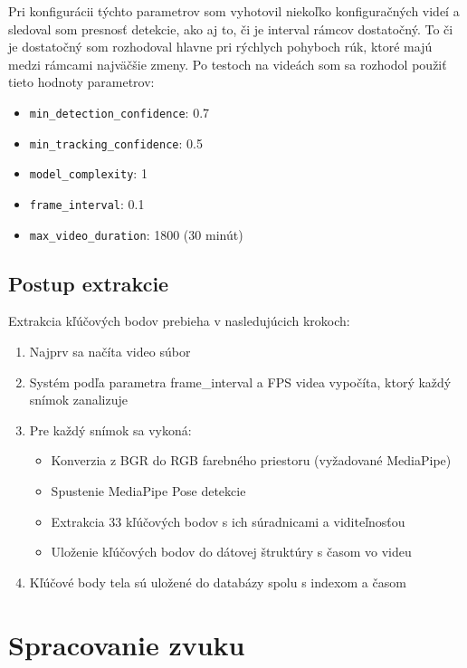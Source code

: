 Pri konfigurácii týchto parametrov som vyhotovil niekoľko konfiguračných videí a sledoval som presnosť detekcie, ako aj to, či je interval rámcov dostatočný.
To či je dostatočný som rozhodoval hlavne pri rýchlych pohyboch rúk, ktoré majú medzi rámcami najväčšie zmeny.
Po testoch na videách som sa rozhodol použiť tieto hodnoty parametrov:

\begin{itemize}
    \item \texttt{min\_detection\_confidence}: 0.7
    \item \texttt{min\_tracking\_confidence}: 0.5
    \item \texttt{model\_complexity}: 1
    \item \texttt{frame\_interval}: 0.1
    \item \texttt{max\_video\_duration}: 1800 (30 minút)
\end{itemize}

\subsection{Postup extrakcie}

Extrakcia kľúčových bodov prebieha v nasledujúcich krokoch:

\begin{enumerate}
    \item Najprv sa načíta video súbor
    \item Systém podľa parametra frame\_interval a FPS videa vypočíta, ktorý každý snímok zanalizuje
    \item Pre každý snímok sa vykoná:
    \begin{itemize}
        \item Konverzia z BGR do RGB farebného priestoru (vyžadované MediaPipe)
        \item Spustenie MediaPipe Pose detekcie
        \item Extrakcia 33 kľúčových bodov s ich súradnicami a viditeľnosťou
        \item Uloženie kľúčových bodov do dátovej štruktúry s časom vo videu
    \end{itemize}
    \item Kľúčové body tela sú uložené do databázy spolu s indexom a časom
\end{enumerate}

\section{Spracovanie zvuku}

